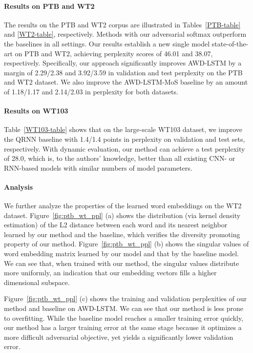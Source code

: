 \documentclass{article}
\begin{document}
\paragraph{Results on PTB and WT2}
The results on the PTB and WT2 corpus are illustrated in Tables~\ref{PTB-table}
and \ref{WT2-table}, respectively. 
Methods with our adversarial softmax outperform
the baselines in all settings.  
Our results establish a new single model state-of-the-art
on PTB and WT2, achieving perplexity scores of 46.01 and 38.07, respectively.
Specifically, our approach significantly improves AWD-LSTM by a margin of  
2.29/2.38 and 3.92/3.59 in validation and test perplexity on the PTB and WT2 dataset.
We also improve the AWD-LSTM-MoS baseline 
by an amount of  1.18/1.17 and 2.14/2.03 in perplexity
for both datasets.




\paragraph{Results on WT103}
Table~\ref{WT103-table} shows that
on the large-scale WT103 dataset,
we improve the QRNN baseline with 1.4/1.4 points in perplexity on validation and test sets, respectively. 
With dynamic evaluation,
our method can achieve a test perplexity of 28.0,
which is,
to the authors' knowledge,
better than all existing CNN- or RNN-based models 
with similar numbers of model parameters.





\paragraph{Analysis}
We further analyze the properties of the learned word embeddings on the WT2 dataset.
Figure~\ref{fig:ptb_wt_ppl} (a) shows the distribution (via kernel density estimation) of the L2 distance between each word and its nearest neighbor learned by our method and the baseline, 
which verifies the diversity promoting property of our method. 
Figure~\ref{fig:ptb_wt_ppl} (b) shows the  
singular values of word embedding matrix learned by our model and that by the baseline model. 
We can see that, when trained with our method, the singular values distribute more uniformly,
an indication that our embedding vectors fills a higher dimensional subspace. 


 Figure~\ref{fig:ptb_wt_ppl} (c) 
 shows the training and validation 
 perplexities  of our method and baseline on AWD-LSTM. 
 We can see that our method is less prone to overfitting. While the baseline model reaches a smaller training error quickly, our method has a larger training error at the same stage because it optimizes a more difficult adversarial  objective, yet yields a significantly lower 
 validation error. 
\end{document}
